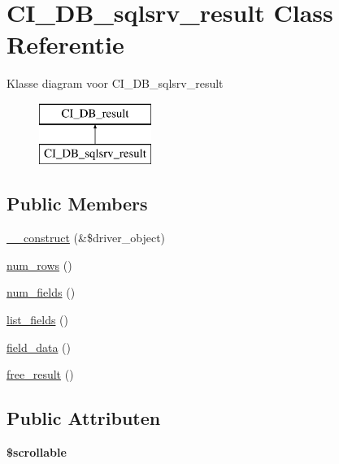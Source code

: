 \hypertarget{class_c_i___d_b__sqlsrv__result}{}\section{C\+I\+\_\+\+D\+B\+\_\+sqlsrv\+\_\+result Class Referentie}
\label{class_c_i___d_b__sqlsrv__result}
Klasse diagram voor C\+I\+\_\+\+D\+B\+\_\+sqlsrv\+\_\+result\begin{figure}[H]
\begin{center}
\leavevmode
\includegraphics[height=2.000000cm]{class_c_i___d_b__sqlsrv__result}
\end{center}
\end{figure}
\subsection*{Public Members}
\begin{DoxyCompactItemize}
\item 
\mbox{\hyperlink{class_c_i___d_b__sqlsrv__result_a8e093c8b6e5733bc3f306385ee426ab7}{\+\_\+\+\_\+construct}} (\&\$driver\+\_\+object)
\item 
\mbox{\hyperlink{class_c_i___d_b__sqlsrv__result_a218657c303ee499b97710ab0cd2f5d6e}{num\+\_\+rows}} ()
\item 
\mbox{\hyperlink{class_c_i___d_b__sqlsrv__result_af831bf363e4d7d661a717a4932af449d}{num\+\_\+fields}} ()
\item 
\mbox{\hyperlink{class_c_i___d_b__sqlsrv__result_a50b54eb4ea7cfd039740f532988ea776}{list\+\_\+fields}} ()
\item 
\mbox{\hyperlink{class_c_i___d_b__sqlsrv__result_a84bffd65e53902ade1591716749a33e3}{field\+\_\+data}} ()
\item 
\mbox{\hyperlink{class_c_i___d_b__sqlsrv__result_aad2d98d6beb3d6095405356c6107b473}{free\+\_\+result}} ()
\end{DoxyCompactItemize}
\subsection*{Public Attributen}
\begin{DoxyCompactItemize}
\item 
\mbox{\label{class_c_i___d_b__sqlsrv__result_a76095eacf021915db9aabc44ecf58555}} 
{\bfseries \$scrollable}
\end{DoxyCompactItemize}
